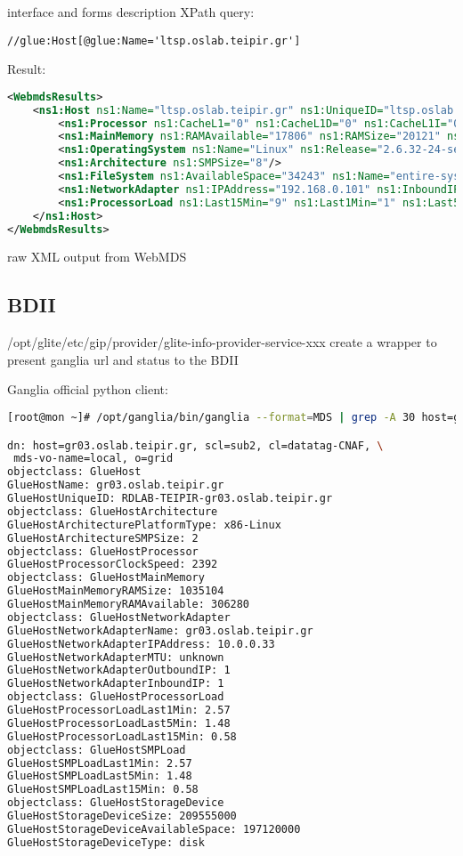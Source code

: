 interface and forms description
\newpage
XPath query:
\begin{verbatim}
//glue:Host[@glue:Name='ltsp.oslab.teipir.gr']
\end{verbatim}
Result:
\begin{lstlisting}[language=XML,caption=WebMDS results from XPath query]
<WebmdsResults>
	<ns1:Host ns1:Name="ltsp.oslab.teipir.gr" ns1:UniqueID="ltsp.oslab.teipir.gr">
		<ns1:Processor ns1:CacheL1="0" ns1:CacheL1D="0" ns1:CacheL1I="0" ns1:CacheL2="0" ns1:ClockSpeed="1600" ns1:InstructionSet="x86_64"/>
		<ns1:MainMemory ns1:RAMAvailable="17806" ns1:RAMSize="20121" ns1:VirtualAvailable="22137" ns1:VirtualSize="24508"/>
		<ns1:OperatingSystem ns1:Name="Linux" ns1:Release="2.6.32-24-server"/>
		<ns1:Architecture ns1:SMPSize="8"/>
		<ns1:FileSystem ns1:AvailableSpace="34243" ns1:Name="entire-system" ns1:ReadOnly="false" ns1:Root="/" ns1:Size="251687"/>
		<ns1:NetworkAdapter ns1:IPAddress="192.168.0.101" ns1:InboundIP="true" ns1:MTU="0" ns1:Name="ltsp.oslab.teipir.gr" ns1:OutboundIP="true"/>
		<ns1:ProcessorLoad ns1:Last15Min="9" ns1:Last1Min="1" ns1:Last5Min="9"/>
	</ns1:Host>
</WebmdsResults>
\end{lstlisting}
raw XML output from WebMDS
\newpage

\subsection{BDII}
/opt/glite/etc/gip/provider/glite-info-provider-service-xxx
create a wrapper to present ganglia url and status to the BDII

Ganglia official python client:
\begin{lstlisting}[language=bash,caption=Python Ganglia client MDS export]
[root@mon ~]# /opt/ganglia/bin/ganglia --format=MDS | grep -A 30 host=gr03

dn: host=gr03.oslab.teipir.gr, scl=sub2, cl=datatag-CNAF, \
 mds-vo-name=local, o=grid
objectclass: GlueHost
GlueHostName: gr03.oslab.teipir.gr
GlueHostUniqueID: RDLAB-TEIPIR-gr03.oslab.teipir.gr
objectclass: GlueHostArchitecture
GlueHostArchitecturePlatformType: x86-Linux
GlueHostArchitectureSMPSize: 2
objectclass: GlueHostProcessor
GlueHostProcessorClockSpeed: 2392
objectclass: GlueHostMainMemory
GlueHostMainMemoryRAMSize: 1035104
GlueHostMainMemoryRAMAvailable: 306280
objectclass: GlueHostNetworkAdapter
GlueHostNetworkAdapterName: gr03.oslab.teipir.gr
GlueHostNetworkAdapterIPAddress: 10.0.0.33
GlueHostNetworkAdapterMTU: unknown
GlueHostNetworkAdapterOutboundIP: 1
GlueHostNetworkAdapterInboundIP: 1
objectclass: GlueHostProcessorLoad
GlueHostProcessorLoadLast1Min: 2.57
GlueHostProcessorLoadLast5Min: 1.48
GlueHostProcessorLoadLast15Min: 0.58
objectclass: GlueHostSMPLoad
GlueHostSMPLoadLast1Min: 2.57
GlueHostSMPLoadLast5Min: 1.48
GlueHostSMPLoadLast15Min: 0.58
objectclass: GlueHostStorageDevice
GlueHostStorageDeviceSize: 209555000
GlueHostStorageDeviceAvailableSpace: 197120000
GlueHostStorageDeviceType: disk
\end{lstlisting}

